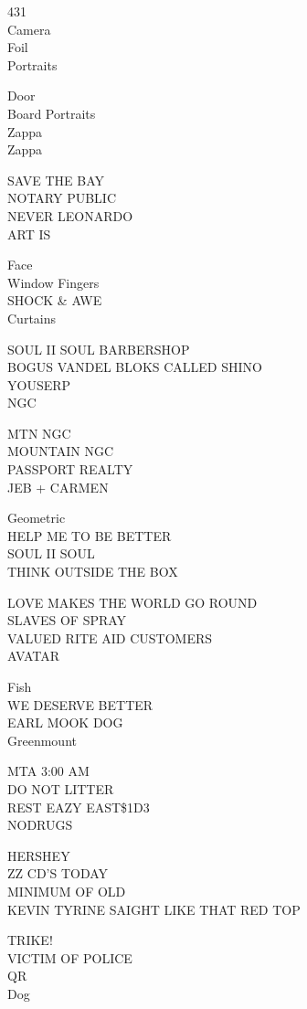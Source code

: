 \documentclass[10pt,letterpaper]{article}
\begin{document}
431\\
Camera\\
Foil\\
Portraits

Door\\
Board Portraits\\
Zappa\\
Zappa

SAVE THE BAY\\
NOTARY PUBLIC\\
NEVER LEONARDO\\
ART IS

Face\\
Window Fingers\\
SHOCK \& AWE\\
Curtains

SOUL II SOUL BARBERSHOP\\
BOGUS VANDEL BLOKS CALLED SHINO\\
YOUSERP\\
NGC

MTN NGC\\
MOUNTAIN NGC\\
PASSPORT REALTY\\
JEB + CARMEN

Geometric\\
HELP ME TO BE BETTER\\
SOUL II SOUL\\
THINK OUTSIDE THE BOX

LOVE MAKES THE WORLD GO ROUND\\
SLAVES OF SPRAY\\
VALUED RITE AID CUSTOMERS\\
AVATAR

Fish\\
WE DESERVE BETTER\\
EARL MOOK DOG\\
Greenmount

MTA 3:00 AM\\
DO NOT LITTER\\
REST EAZY EAST\$1D3\\
NODRUGS

HERSHEY\\
ZZ CD'S TODAY\\
MINIMUM OF OLD\\
KEVIN TYRINE SAIGHT LIKE THAT RED TOP

TRIKE!\\
VICTIM OF POLICE\\
QR\\
Dog
\end{document}
